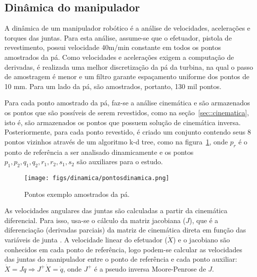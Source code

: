 \subsection{Dinâmica do manipulador}\label{sec::dinamica}

A dinâmica de um manipulador robótico é a análise de velocidades, acelerações e
torques das juntas. Para esta análise, assume-se que o efetuador, pistola de
revestimento, possui velocidade 40m/min constante em todos os pontos amostrados
da pá. Como velocidades e acelerações exigem a computação de derivadas, é
realizada uma melhor discretização da pá da turbina, na qual o passo de
amostragem é menor e um filtro garante espaçamento uniforme dos pontos de 10 mm.
Para um lado da pá, são amostrados, portanto, 130 mil pontos.

Para cada ponto amostrado da pá, faz-se a análise cinemática e são armazenados
os pontos que são possíveis de serem revestidos, como na
seção~\ref{sec::cinematica}, isto é, são armazenados os pontos que possuem
solução de cinemática inversa. Posteriormente, para cada ponto revestido, é
criado um conjunto contendo seus 8 pontos vizinhos através de um algoritmo k-d
tree, como na figura~\ref{fig::pontosdin}, onde $p_r$ é o ponto de referência a
ser analisado dinamicamente e os pontos ${p_1,p_2,q_1,q_2,r_1,r_2,s_1,s_2}$ são auxiliares
para o estudo. 

\begin{figure}[h!]	
	\texttt{[image: figs/dinamica/pontosdinamica.png]}
	\caption{Pontos exemplo amostrados da pá.}
	\label{fig::pontosdin}
\end{figure}

As velocidades angulares das juntas são calculadas a partir da cinemática
diferencial. Para isso, usa-se o cálculo da matriz jacobiana ($J$), que é a
diferenciação (derivadas parciais) da matriz de cinemática direta em função das
variáveis de junta \citep{sciavicco2000differential}. A velocidade linear do
efetuador ($\dot{X}$) e o jacobiano são conhecidos em cada ponto de referência, logo
podem-se calcular as velocidades das juntas do manipulador entre o ponto de
referência e cada ponto auxiliar: $\dot{X} = J\dot{q}\Rightarrow
J^+\dot{X}=\dot{q}$, onde $J^+$ é a pseudo inversa Moore-Penrose de $J$.

